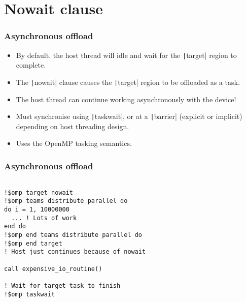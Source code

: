 \documentclass{beamer}
\begin{document}
\section{Nowait clause}
\begin{frame}
\frametitle{Asynchronous offload}
\begin{itemize}
  \item By default, the host thread will idle and wait for the \texttt|target| region to complete.
  \item The \texttt|nowait| clause causes the \texttt|target| region to be offloaded as a task.
  \item The host thread can continue working asynchronously with the device!
  \item Must synchronise using \texttt|taskwait|, or at a \texttt|barrier| (explicit or implicit) depending on host threading design.
  \item Uses the OpenMP tasking semantics.
\end{itemize}
\end{frame}

\begin{frame}[fragile]
\frametitle{Asynchronous offload}
\begin{verbatim}

!$omp target nowait
!$omp teams distribute parallel do
do i = 1, 10000000
  ... ! Lots of work
end do
!$omp end teams distribute parallel do
!$omp end target
! Host just continues because of nowait

call expensive_io_routine()

! Wait for target task to finish
!$omp taskwait

\end{verbatim}
\end{frame}

\end{document}
